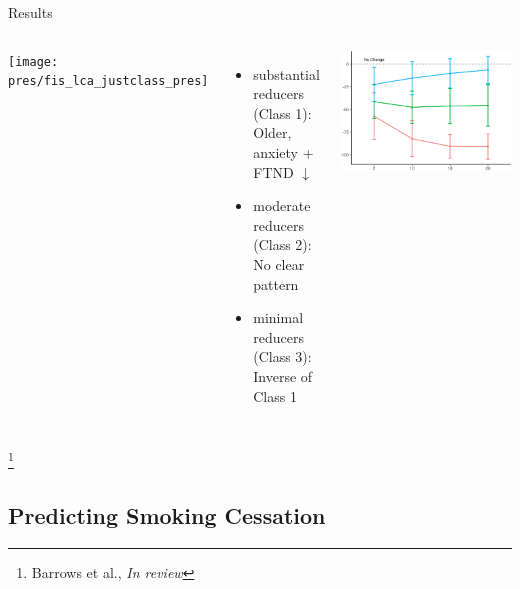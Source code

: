 \documentclass[aspectratio=169]{beamer}
\newcommand\blfootnote[1]{%
	\begingroup
	\renewcommand\thefootnote{}\footnote{#1}%
	\addtocounter{footnote}{-1}%
	\endgroup
}
\newcommand{\reviewcite}{\blfootnote{\tiny Barrows et al., \textit{In review}}}
\begin{document}
\begin{frame}{\tiny Results}
	\begin{columns}
			\texttt{[image: pres/fis\_lca\_justclass\_pres]}
	

		\begin{itemize}
				\tiny
			\item \textcolor{class1}{substantial reducers (Class 1): } Older, anxiety  + FTND $\downarrow$
			\item \textcolor{class2}{moderate reducers (Class 2): }No clear pattern
			\item \textcolor{class3}{minimal reducers (Class 3): }Inverse of \textcolor{class1}{Class 1}
		\end{itemize}
		
		\vspace{2mm}
		\includegraphics[width=\columnwidth]{smoking_traj_notitle}

	\end{columns}
	\reviewcite

\end{frame}



%
\subsection{Predicting Smoking Cessation}
\end{document}
